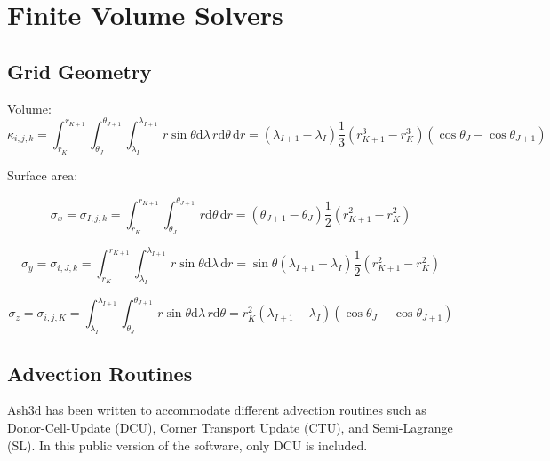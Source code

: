 \chapter{Finite Volume Solvers}\label{ChapAppendFVSolvers}
\section{Grid Geometry}
Volume:
\begin{equation}\label{EqCellVolLL}
\kappa_{i,j,k} = \int_{r_K}^{r_{K+1}} \int_{\theta_J}^{\theta_{J+1}} \int_{\lambda_I}^{\lambda_{I+1}}
\, r \sin{\theta} \mathrm{d}\lambda \, r \mathrm{d}\theta \, \mathrm{d}r
= \left( \lambda_{I+1} - \lambda_{I} \right) \frac{1}{3} \left( r_{K+1}^3 - r_{K}^3 \right)
\left( \cos{\theta_{J}} - \cos{\theta_{J+1}}\right)
\end{equation}

Surface area:

\begin{equation}\label{EqCellSurfILL}
\sigma_x=\sigma_{I,j,k} = \int_{r_K}^{r_{K+1}} \int_{\theta_J}^{\theta_{J+1}}
\, r \mathrm{d}\theta \, \mathrm{d}r
= \left( \theta_{J+1} - \theta_{J} \right) \frac{1}{2} \left( r_{K+1}^2 - r_{K}^2 \right)
\end{equation}

\begin{equation}\label{EqCellSurfJLL}
\sigma_y=\sigma_{i,J,k} = \int_{r_K}^{r_{K+1}} \int_{\lambda_I}^{\lambda_{I+1}}
\, r \sin{\theta} \mathrm{d}\lambda \, \mathrm{d}r
= \sin{\theta}\left( \lambda_{I+1} - \lambda_{I} \right) \frac{1}{2} \left( r_{K+1}^2 - r_{K}^2 \right)
\end{equation}

\begin{equation}\label{EqCellSurfKLL}
\sigma_z=\sigma_{i,j,K} = \int_{\lambda_I}^{\lambda_{I+1}} \int_{\theta_J}^{\theta_{J+1}}
\, r \sin{\theta} \mathrm{d}\lambda \, r\mathrm{d}\theta
= r_{K}^2 \left( \lambda_{I+1} - \lambda_{I} \right) \left( \cos{\theta_{J}} - \cos{\theta_{J+1}}  \right)
\end{equation}



\section{Advection Routines}
Ash3d has been written to accommodate different advection routines such as
Donor-Cell-Update (DCU), Corner Transport Update (CTU), and Semi-Lagrange (SL).
In this public version of the software, only DCU is included.

